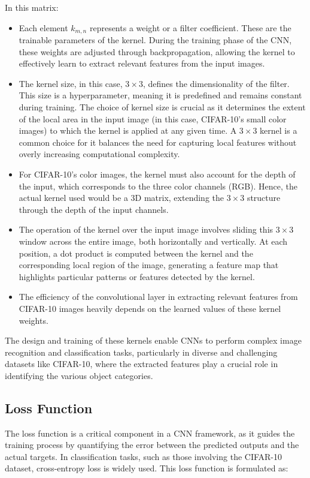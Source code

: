 \documentclass[conference]{IEEEtran}
\begin{document}
	In this matrix:
	\begin{itemize}
		\item Each element \(k_{m,n}\) represents a weight or a filter coefficient. These are the trainable parameters of the kernel. During the training phase of the CNN, these weights are adjusted through backpropagation, allowing the kernel to effectively learn to extract relevant features from the input images.
		
		\item The kernel size, in this case, \(3 \times 3\), defines the dimensionality of the filter. This size is a hyperparameter, meaning it is predefined and remains constant during training. The choice of kernel size is crucial as it determines the extent of the local area in the input image (in this case, CIFAR-10's small color images) to which the kernel is applied at any given time. A \(3 \times 3\) kernel is a common choice for it balances the need for capturing local features without overly increasing computational complexity.
		
		\item For CIFAR-10's color images, the kernel must also account for the depth of the input, which corresponds to the three color channels (RGB). Hence, the actual kernel used would be a 3D matrix, extending the \(3 \times 3\) structure through the depth of the input channels.
		
		\item The operation of the kernel over the input image involves sliding this \(3 \times 3\) window across the entire image, both horizontally and vertically. At each position, a dot product is computed between the kernel and the corresponding local region of the image, generating a feature map that highlights particular patterns or features detected by the kernel.
		
		\item The efficiency of the convolutional layer in extracting relevant features from CIFAR-10 images heavily depends on the learned values of these kernel weights.
	\end{itemize}
	
	The design and training of these kernels enable CNNs to perform complex image recognition and classification tasks, particularly in diverse and challenging datasets like CIFAR-10, where the extracted features play a crucial role in identifying the various object categories.
	
	\subsection{Loss Function}
	The loss function is a critical component in a CNN framework, as it guides the training process by quantifying the error between the predicted outputs and the actual targets. In classification tasks, such as those involving the CIFAR-10 dataset, cross-entropy loss is widely used. This loss function is formulated as:
	
\end{document}
